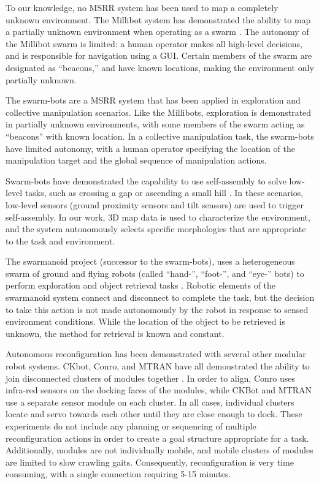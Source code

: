 \documentclass[conference]{IEEEtran}
\begin{document}
To our knowledge, no MSRR system has been used to map a completely unknown environment. The Millibot system has demonstrated the ability to map a partially unknown environment when operating as a swarm \cite{Grabowski2000}. The autonomy of the Millibot swarm is limited: a human operator makes all high-level decisions, and is responsible for navigation using a GUI. Certain members of the swarm are designated as ``beacons,'' and have known locations, making the environment only partially unknown.

The swarm-bots are a MSRR system that has been applied in exploration \cite{Dorigo2005} and collective manipulation \cite{Mondada2005} scenarios.  Like the Millibots, exploration is demonstrated in partially unknown environments, with some members of the swarm acting as ``beacons'' with known location.  In a collective manipulation task, the swarm-bots have limited autonomy, with a human operator specifying the location of the manipulation target and the global sequence of manipulation actions.

Swarm-bots have demonstrated the capability to use self-assembly to solve low-level tasks, such as crossing a gap \cite{Mondada2004} or ascending a small hill \cite{OGrady2005}.  In these scenarios, low-level sensors (ground proximity sensors and tilt sensors) are used to trigger self-assembly.  In our work, 3D map data is used to characterize the environment, and the system autonomously selects specific morphologies that are appropriate to the task and environment. 

The swarmanoid project (successor to the swarm-bots), uses a heterogeneous swarm of ground and flying robots (called ``hand-'', ``foot-'', and ``eye-'' bots) to perform exploration and object retrieval tasks  \cite{Dorigo2013}. Robotic elements of the swarmanoid system connect and disconnect to complete the task, but the decision to take this action is not made autonomously by the robot in response to sensed environment conditions. While the location of the object to be retrieved is unknown, the method for retrieval is known and constant.

Autonomous reconfiguration has been demonstrated with several other modular robot systems. CKbot, Conro, and MTRAN have all demonstrated the ability to join disconnected clusters of modules together \cite{Yim2007, Rubenstein2004,Murata2006}. In order to align, Conro uses infra-red sensors on the docking faces of the modules, while CKBot and MTRAN use a separate sensor module on each cluster.  In all cases, individual clusters locate and servo towards each other until they are close enough to dock. These experiments do not include any planning or sequencing of multiple reconfiguration actions in order to create a goal structure appropriate for a task.  Additionally,  modules are not individually mobile, and mobile clusters of modules are limited to slow crawling gaits.  Consequently, reconfiguration is very time consuming, with a single connection requiring 5-15 minutes.
\end{document}
